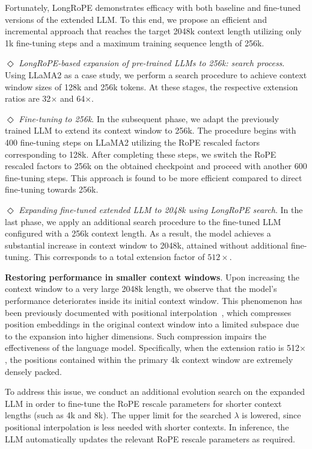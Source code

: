Fortunately, LongRoPE demonstrates efficacy with both baseline and fine-tuned versions of the extended LLM. To this end, we propose an efficient and incremental approach that reaches the target 2048k context length utilizing only 1k fine-tuning steps and a maximum training sequence length of 256k.

$\Diamond$ \textit{LongRoPE-based expansion of pre-trained LLMs to 256k: search process}. Using LLaMA2 as a case study, we perform a search procedure to achieve context window sizes of 128k and 256k tokens. At these stages, the respective extension ratios are 32$\times$ and 64$\times$.

$\Diamond$ \textit{Fine-tuning to 256k}. In the subsequent phase, we adapt the previously trained LLM to extend its context window to 256k. The procedure begins with 400 fine-tuning steps on LLaMA2 utilizing the RoPE rescaled factors corresponding to 128k. After completing these steps, we switch the RoPE rescaled factors to 256k on the obtained checkpoint and proceed with another 600 fine-tuning steps. This approach is found to be more efficient compared to direct fine-tuning towards 256k.

$\Diamond$ \textit{Expanding fine-tuned extended LLM to 2048k using LongRoPE search}. In the last phase, we apply an additional search procedure to the fine-tuned LLM configured with a 256k context length. As a result, the model achieves a substantial increase in context window to 2048k, attained without additional fine-tuning. This corresponds to a total extension factor of $512\times$.

\textbf{Restoring performance in smaller context windows}. Upon increasing the context window to a very large 2048k length, we observe that the model's performance deteriorates inside its initial context window. This phenomenon has been previously documented with positional interpolation~\cite{pi}, which compresses position embeddings in the original context window into a limited subspace due to the expansion into higher dimensions. Such compression impairs the effectiveness of the language model. Specifically, when the extension ratio is 512$\times$, the positions contained within the primary 4k context window are extremely densely packed.

To address this issue, we conduct an additional evolution search on the expanded LLM in order to fine-tune the RoPE rescale parameters for shorter context lengths (such as 4k and 8k). The upper limit for the searched $\lambda$ is lowered, since positional interpolation is less needed with shorter contexts. In inference, the LLM automatically updates the relevant RoPE rescale parameters as required.

